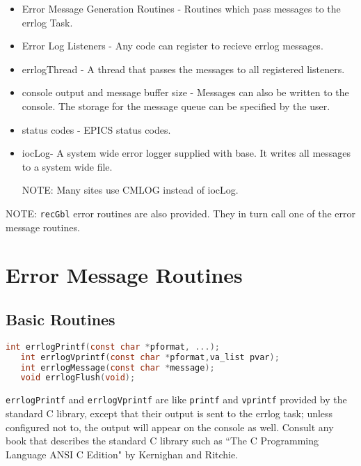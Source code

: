 \begin{itemize}
\item Error Message Generation Routines - Routines which pass messages to the errlog Task.

\item Error Log Listeners - Any code can register to recieve errlog messages.

\item errlogThread - A thread that passes the messages to all registered listeners.

\item console output and message buffer size - Messages can also be written to the console.
The storage for the message queue can be specified by the user.

\item status codes - EPICS status codes.

\item iocLog- A system wide error logger supplied with base.
It writes all messages to a system wide file.

NOTE: Many sites use CMLOG instead of iocLog.

\end{itemize}

NOTE: \verb|recGbl| error routines are also provided.
They in turn call one of the error message routines.

\section{Error Message Routines}

\subsection{Basic Routines}

\begin{lstlisting}[language=C]
   int errlogPrintf(const char *pformat, ...);
   int errlogVprintf(const char *pformat,va_list pvar);
   int errlogMessage(const char *message);
   void errlogFlush(void);
\end{lstlisting}
\verb|errlogPrintf| and  \verb|errlogVprintf| are like \verb|printf| and \verb|vprintf| provided by the standard C library, except that their output is sent to the errlog task; unless configured not to, the output will appear on the console as well.
Consult any book that describes the standard C library such as ``The C Programming Language ANSI C Edition" by Kernighan and Ritchie.


